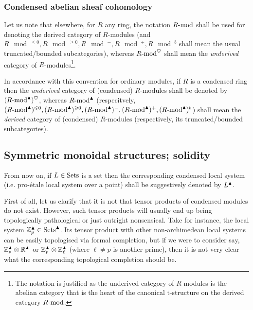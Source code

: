         \subsubsection{Condensed abelian sheaf cohomology}
            \begin{convention} \label{conv: derived_categories_of_condensed_modules}
                Let us note that elsewhere, for $R$ any ring, the notation $R\mod$ shall be used for denoting the derived category of $R$-modules (and $R\mod^{\leq 0}, R\mod^{\geq 0}, R\mod^-, R\mod^+, R\mod^b$ shall mean the usual truncated/bounded subcategories), whereas $R\mod^{\heart}$ shall mean the \textit{underived} category of $R$-modules\footnote{The notation is justified as the underived category of $R$-modules is the abelian category that is the heart of the canonical t-structure on the derived category $R\mod$.}. 
                
                In accordance with this convention for ordinary modules, if $R$ is a condensed ring then the \textit{underived} category of (condensed) $R$-modules shall be denoted by $(R\mod^{\cond})^{\heart}$, whereas $R\mod^{\cond}$ (respecitvely, $(R\mod^{\cond})^{\leq 0}, (R\mod^{\cond})^{\geq 0}, (R\mod^{\cond})^-, (R\mod^{\cond})^+, (R\mod^{\cond})^b$) shall mean the \textit{derived} category of (condensed) $R$-modules (respectively, its truncated/bounded subcategories).
            \end{convention}
        
    \subsection{Symmetric monoidal structures; solidity}
        \begin{convention}
            From now on, if $L \in \Sets$ is a set then the corresponding condensed local system (i.e. pro-\'etale local system over a point) shall be suggestively denoted by $L^{\cond}$.
        \end{convention}
    
        First of all, let us clarify that it is not that tensor products of condensed modules do not exist. However, such tensor products will usually end up being topologically pathological or just outright nonsensical. Take for instance, the local system $\Z_p^{\cond} \in \Sets^{\cond}$. Its tensor product with other non-archimedean local systems can be easily topologised via formal completion, but if we were to consider say, $\Z_p^{\cond} \tensor \R^{\cond}$ or $\Z_p^{\cond} \tensor \Z_{\ell}^{\cond}$ (where $\ell \not = p$ is another prime), then it is not very clear what the corresponding topological completion should be.  